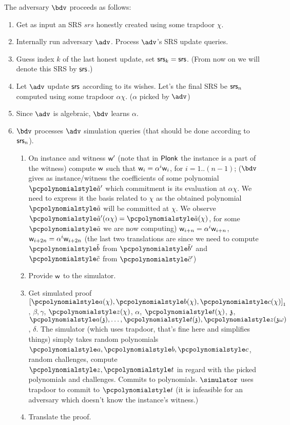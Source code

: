 \documentclass[runningheads,11pt]{llncs}
\begin{document}
The adversary $\bdv$ proceeds as follows:
\begin{enumerate}
\item Get as input an SRS $srs$ honestly created using some trapdoor $\chi$.
\item Internally run adversary $\adv$. Process $\adv$'s SRS update queries.
\item Guess index $k$ of the last honest update, set $\mathsf{srs}_k = \mathsf{srs}$. (From now
  on we will denote this SRS by $\mathsf{srs}$.)
\item Let $\adv$ update $\mathsf{srs}$ according to its wishes. Let's the final SRS be
  $\mathsf{srs}_n$ computed using some trapdoor $\alpha \chi$. ($\alpha$ picked by $\adv$)
\item Since $\adv$ is algebraic, $\bdv$ learns $\alpha$.
\item $\bdv$ processes $\adv$ simulation queries (that should be done according
  to $\mathsf{srs}_n$).
  \begin{enumerate}
  \item On instance and witness $\mathsf{w}'$ (note that in $\textnormal{\textsf{Plonk}}$ the instance is a
    part of the witness) compute $\mathsf{w}$ such that $\mathsf{w}_i = \alpha^i \mathsf{w}_i$,
    for $i = 1 .. (n - 1)$; ($\bdv$ gives as instance/witness the coefficients
    of some polynomial $\p{\tilde{a}'}$ which commitment is its evaluation at
    $\alpha \chi$. We need to express it the basis related to $\chi$ as the
    obtained polynomial $\p{\tilde{a}}$ will be committed at $\chi$. We observe
    $\p{\tilde{a}'} (\alpha \chi) = \p{\tilde{a}} (\chi)$, for some $\p{\tilde{a}}$ we are now
    computing) $\mathsf{w}_{i + n} = \alpha^i \mathsf{w}_{i + n}$,
    $\mathsf{w}_{i + 2n} = \alpha^i \mathsf{w}_{i+ 2n}$ (the last two translations are
    since we need to compute $\p{\tilde{b}}$ from $\p{\tilde{b}'}$ and $\p{\tilde{c}}$ from $\p{\tilde{c}'}$)
  \item Provide $\mathsf{w}$ to the simulator.
  \item Get simulated proof $\gone{\p{a} (\chi), \p{b} (\chi), \p{c} (\chi)}$
    , $\beta, \gamma$, $\p{z} (\chi)$,
    $\alpha$, $\p{t} (\chi)$, $\mathfrak{z}$,
    $\p{a} (\chz), \ldots, \p{t} (\chz), \p{z} (\chz \omega)$, $\delta$. The
    simulator (which uses trapdoor, that's fine here and simplifies things)
    simply takes random polynomials $\p{a}, \p{b}, \p{c}$, random challenges,
    compute $\p{z}, \p{t}$ in regard with the picked polynomials and
    challenges. Commits to polynomials. $\simulator$ uses trapdoor to commit to
    $\p{t}$ (it is infeasible for an adversary which doesn't know the instance's
    witness.)
  \item Translate the proof.

\end{enumerate}
\end{enumerate}
\end{document}
